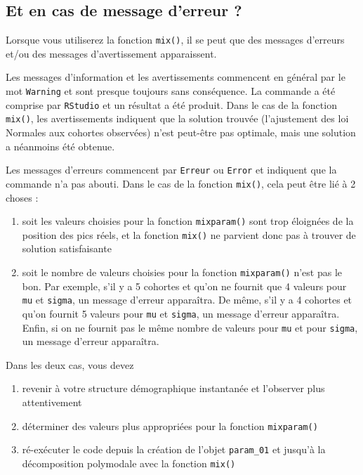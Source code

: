 \documentclass[
  french,
  a4paper,
  DIV=11,
  numbers=noendperiod,
  oneside]{scrreprt}
\providecommand{\tightlist}{%
  \setlength{\itemsep}{0pt}\setlength{\parskip}{0pt}}
\begin{document}
\begin{tcolorbox}
\subsection{Et en cas de message d'erreur
?}\label{et-en-cas-de-message-derreur}

Lorsque vous utiliserez la fonction \texttt{mix()}, il se peut que des
messages d'erreurs et/ou des messages d'avertissement apparaissent.

{} Les messages d'information et les avertissements
commencent en général par le mot \texttt{Warning} et sont presque
toujours sans conséquence. La commande a été comprise par
\texttt{RStudio} et un résultat a été produit. Dans le cas de la
fonction \texttt{mix()}, les avertissements indiquent que la solution
trouvée (l'ajustement des loi Normales aux cohortes observées) n'est
peut-être pas optimale, mais une solution a néanmoins été obtenue.

{} Les messages d'erreurs commencent par \texttt{Erreur} ou
\texttt{Error} et indiquent que la commande n'a pas abouti. Dans le cas
de la fonction \texttt{mix()}, cela peut être lié à 2 choses :

\begin{enumerate}
\def\labelenumi{\arabic{enumi}.}
\tightlist
\item
  soit les valeurs choisies pour la fonction \texttt{mixparam()} sont
  trop éloignées de la position des pics réels, et la fonction
  \texttt{mix()} ne parvient donc pas à trouver de solution
  satisfaisante
\item
  soit le nombre de valeurs choisies pour la fonction
  \texttt{mixparam()} n'est pas le bon. Par exemple, s'il y a 5 cohortes
  et qu'on ne fournit que 4 valeurs pour \texttt{mu} et \texttt{sigma},
  un message d'erreur apparaîtra. De même, s'il y a 4 cohortes et qu'on
  fournit 5 valeurs pour \texttt{mu} et \texttt{sigma}, un message
  d'erreur apparaîtra. Enfin, si on ne fournit pas le même nombre de
  valeurs pour \texttt{mu} et pour \texttt{sigma}, un message d'erreur
  apparaîtra.
\end{enumerate}

Dans les deux cas, vous devez

\begin{enumerate}
\def\labelenumi{\arabic{enumi}.}
\tightlist
\item
  revenir à votre structure démographique instantanée et l'observer plus
  attentivement
\item
  déterminer des valeurs plus appropriées\footnotemark{} pour la
  fonction \texttt{mixparam()}
\item
  ré-exécuter le code depuis la création de l'objet \texttt{param\_01}
  et jusqu'à la décomposition polymodale avec la fonction \texttt{mix()}
\end{enumerate}


\end{tcolorbox}
\end{document}

